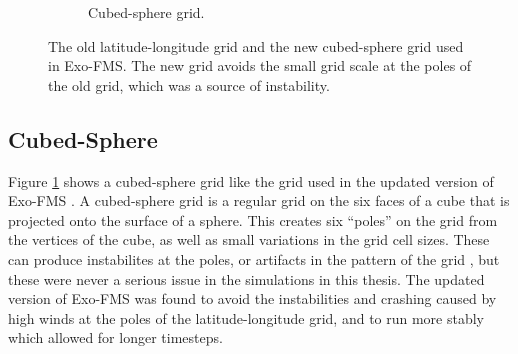 \begin{figure}
\begin{subfigure}[t]{0.37\textwidth}
    \caption{Cubed-sphere grid.}
    \label{fig:gcm-grids-cs}
  \end{subfigure}
  \caption{The old latitude-longitude grid and the new cubed-sphere grid used in Exo-FMS. The new grid avoids the small grid scale at the poles of the old grid, which was a source of instability.}
  \label{fig:gcm-grids}
\end{figure}

\subsection{Cubed-Sphere}

Figure \ref{fig:gcm-grids-cs} shows a cubed-sphere grid like the grid used in the updated version of Exo-FMS \citep{putman2007cubed}. A cubed-sphere grid is a regular grid on the six faces of a cube that is projected onto the surface of a sphere. This creates six ``poles'' on the grid from the vertices of the cube, as well as small variations in the grid cell sizes. These can produce instabilites at the poles, or artifacts in the pattern of the grid \citep{putman2007cubed}, but these were never a serious issue in the simulations in this thesis. The updated version of Exo-FMS was found to avoid the instabilities and crashing caused by high winds at the poles of the latitude-longitude grid, and to run more stably which allowed for longer timesteps.




%
%
%
%
%








